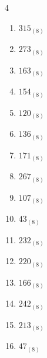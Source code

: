 \begin{multicols}{4}
\begin{enumerate}
  \item $315_{(8)}$

        \phantom{$=205$}

  \item $273_{(8)}$

        \phantom{$=187$}

  \item $163_{(8)}$

        \phantom{$=115$}

  \item $154_{(8)}$

        \phantom{$=108$}

  \item $120_{(8)}$

        \phantom{$=80$}

  \item $136_{(8)}$

        \phantom{$=94$}

  \item $171_{(8)}$

        \phantom{$=121$}

  \item $267_{(8)}$

        \phantom{$=183$}

  \item $107_{(8)}$

        \phantom{$=71$}

  \item $43_{(8)}$

        \phantom{$=35$}

  \item $232_{(8)}$

        \phantom{$=154$}

  \item $220_{(8)}$

        \phantom{$=144$}

  \item $166_{(8)}$

        \phantom{$=118$}

\columnbreak %

  \item $242_{(8)}$

        \phantom{$=162$}

  \item $213_{(8)}$

        \phantom{$=139$}

  \item $47_{(8)}$


\end{enumerate}
\end{multicols}
